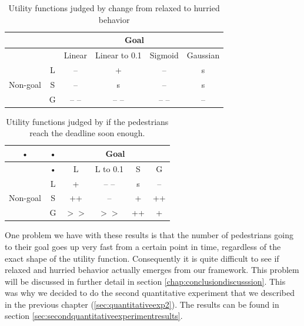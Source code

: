 \documentclass[11pt]{book}
\begin{document}
\begin{table}[h!]
\centering
\begin{tabular}{|c|c|c|c|c|c|}
\hline
 & \multicolumn{5}{c|}{Goal}\\
 \hline
 & & Linear & Linear to 0.1 & Sigmoid & Gaussian\\
 \hline
 \multirow{3}{*}{Non-goal} & L & -- & + & -- & s\\
 & S & -- & s & -- & s\\
 & G & -- -- & -- -- & -- -- & --\\
 \hline
\end{tabular}
\caption{Utility functions judged by change from relaxed to hurried behavior}
\label{tab:judgegoalhurry}
\end{table}

\begin{table}[h!]
\centering
\begin{tabular}{|c|c|c|c|c|c|}
\hline
• & • & \multicolumn{4}{c|}{Goal} \\ 
\hline 
 & • & L & L to 0.1 & S & G \\ 
\hline 
\multirow{3}{*}{Non-goal} & L & + & -- -- & s & -- \\ 
 & S & ++ & -- & + & ++ \\ 
 & G & $>>$ & $>>$ & ++ & + \\ 
\hline 
\end{tabular} 
\caption{Utility functions judged by if the pedestrians reach the deadline soon enough.}
\label{tab:judgegoaldeadline}
\end{table}

%


One problem we have with these results is that the number of pedestrians going to their goal goes up very fast from a certain point in time, regardless of the exact shape of the utility function. Consequently it is quite difficult to see if relaxed and hurried behavior actually emerges from our framework. This problem will be discussed in further detail in section \ref{chap:conclusiondiscusssion}. This was why we decided to do the second quantitative experiment that we described in the previous chapter (\ref{sec:quantitativeexp2}). The results can be found in section \ref{sec:secondquantitativeexperimentresults}.
\end{document}
